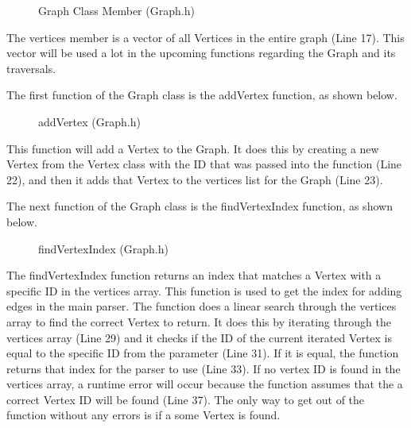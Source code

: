 \documentclass[letterpaper, 10pt]{article}
\begin{document}
\begin{figure}[H]
  \centering
   
  \caption{Graph Class Member (Graph.h)}
  \label{fig:figure2.12}
\end{figure}

\noindent
The vertices member is a vector of all Vertices in the entire graph (Line 17). This vector will be used a lot in the upcoming functions regarding the Graph and its traversals.

\vspace{1em}

\noindent
The first function of the Graph class is the addVertex function, as shown below.

\begin{figure}[H]
  \centering
   
  \caption{addVertex (Graph.h)}
  \label{fig:figure2.13}
\end{figure}

\noindent
This function will add a Vertex to the Graph. It does this by creating a new Vertex from the Vertex class with the ID that was passed into the function (Line 22), and then it adds that Vertex to the vertices list for the Graph (Line 23).

\vspace{1em}
\noindent
The next function of the Graph class is the findVertexIndex function, as shown below.

\begin{figure}[H]
  \centering
   
  \label{fig:figure2.14-part1}
\end{figure}

\begin{figure}[H]
  \centering
   
  \caption{findVertexIndex (Graph.h)}
  \label{fig:figure2.14-part2}
\end{figure}

\noindent
The findVertexIndex function returns an index that matches a Vertex with a specific ID in the vertices array. This function is used to get the index for adding edges in the main parser. The function does a linear search through the vertices array to find the correct Vertex to return. It does this by iterating through the vertices array (Line 29) and it checks if the ID of the current iterated Vertex is equal to the specific ID from the parameter (Line 31). If it is equal, the function returns that index for the parser to use (Line 33). If no vertex ID is found in the vertices array, a runtime error will occur because the function assumes that the a correct Vertex ID will be found (Line 37). The only way to get out of the function without any errors is if a some Vertex is found.
\end{document}
